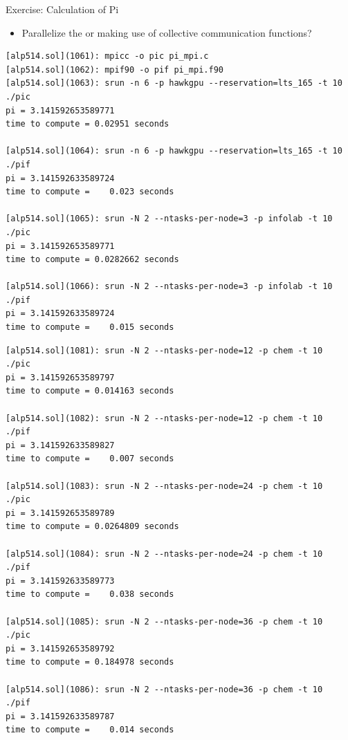 \documentclass[9pt,c]{beamer}
\begin{document}
\begin{frame}{Exercise: Calculation of Pi}
  \begin{itemize}
    \item Parallelize the  or  making use of collective communication functions?
  \end{itemize}
  \begin{exampleblock}{}
    \begin{lstlisting}[basicstyle=\scriptsize\ttfamily]
[alp514.sol](1061): mpicc -o pic pi_mpi.c
[alp514.sol](1062): mpif90 -o pif pi_mpi.f90
[alp514.sol](1063): srun -n 6 -p hawkgpu --reservation=lts_165 -t 10 ./pic
pi = 3.141592653589771
time to compute = 0.02951 seconds

[alp514.sol](1064): srun -n 6 -p hawkgpu --reservation=lts_165 -t 10 ./pif
pi = 3.141592633589724
time to compute =    0.023 seconds

[alp514.sol](1065): srun -N 2 --ntasks-per-node=3 -p infolab -t 10  ./pic
pi = 3.141592653589771
time to compute = 0.0282662 seconds

[alp514.sol](1066): srun -N 2 --ntasks-per-node=3 -p infolab -t 10  ./pif
pi = 3.141592633589724
time to compute =    0.015 seconds
    \end{lstlisting}
  \end{exampleblock}
  \framebreak
  \begin{exampleblock}{}
    \begin{lstlisting}[basicstyle=\scriptsize\ttfamily]
[alp514.sol](1081): srun -N 2 --ntasks-per-node=12 -p chem -t 10  ./pic
pi = 3.141592653589797
time to compute = 0.014163 seconds

[alp514.sol](1082): srun -N 2 --ntasks-per-node=12 -p chem -t 10  ./pif
pi = 3.141592633589827
time to compute =    0.007 seconds

[alp514.sol](1083): srun -N 2 --ntasks-per-node=24 -p chem -t 10  ./pic
pi = 3.141592653589789
time to compute = 0.0264809 seconds

[alp514.sol](1084): srun -N 2 --ntasks-per-node=24 -p chem -t 10  ./pif
pi = 3.141592633589773
time to compute =    0.038 seconds

[alp514.sol](1085): srun -N 2 --ntasks-per-node=36 -p chem -t 10  ./pic
pi = 3.141592653589792
time to compute = 0.184978 seconds

[alp514.sol](1086): srun -N 2 --ntasks-per-node=36 -p chem -t 10  ./pif
pi = 3.141592633589787
time to compute =    0.014 seconds
    \end{lstlisting}
  \end{exampleblock}
\end{frame}
\end{document}
